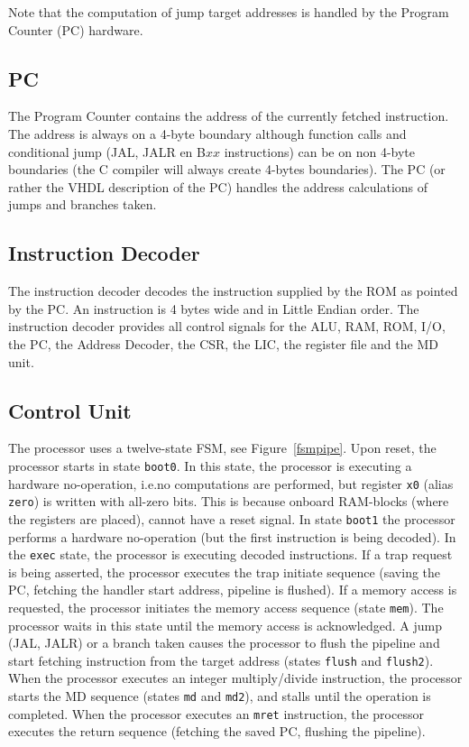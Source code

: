 \documentclass[12pt]{article}
\begin{document}
Note that the computation of jump target addresses is handled by the Program Counter (PC) hardware.

\subsection{PC}
\label{sec:pc}
The Program Counter contains the address of the currently fetched instruction. The address is always on a 4-byte boundary although function calls and conditional jump (JAL, JALR en B$xx$ instructions) can be on non 4-byte boundaries (the C compiler will always create 4-bytes boundaries). The PC (or rather the VHDL description of the PC) handles the address calculations of jumps and branches taken. %

\subsection{Instruction Decoder}
\label{sec:instructiondecoder}
The instruction decoder decodes the instruction supplied by the ROM as pointed by the PC. An instruction is 4 bytes wide and in Little Endian order. The instruction decoder provides all control signals for the ALU, RAM, ROM, I/O, the PC, the Address Decoder, the CSR, the LIC, the register file and the MD unit. %

\subsection{Control Unit}
The processor uses a twelve-state FSM, see Figure~\ref{fsmpipe}. Upon reset, the processor starts in state \lstinline|boot0|. In this state, the processor is executing a hardware no-operation, i.e.\@ no computations are performed, but register \lstinline|x0| (alias \lstinline|zero|) is written with all-zero bits. This is because onboard RAM-blocks (where the registers are placed), cannot have a reset signal. In state \lstinline|boot1| the processor performs a hardware no-operation (but the first instruction is being decoded). In the \lstinline|exec| state, the processor is executing decoded instructions. If a trap request is being asserted, the processor executes the trap initiate sequence (saving the PC, fetching the handler start address, pipeline is flushed). If a memory access is requested, the processor initiates the memory access sequence (state \lstinline|mem|). The processor waits in this state until the memory access is acknowledged. A jump (JAL, JALR) or a branch taken causes the processor to flush the pipeline and start fetching instruction from the target address (states \lstinline|flush| and \lstinline|flush2|). When the processor executes an integer multiply/divide instruction, the processor starts the MD sequence (states \lstinline|md| and \lstinline|md2|), and stalls until the operation is completed. When the processor executes an \lstinline|mret| instruction, the processor executes the return sequence (fetching the saved PC, flushing the pipeline).
\end{document}
